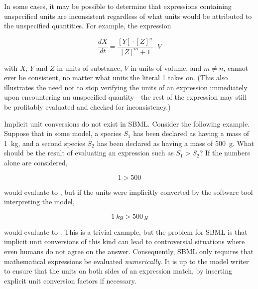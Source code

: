 In some cases, it may be possible to determine that expressions
containing unspecified units are inconsistent regardless of what
units would be attributed to the unspecified quantities.  For
example, the expression
\begin{linenomath}
  \begin{equation*}
    \frac{dX}{dt} = \frac{[Y] \cdot [Z]^n}{[Z]^m + 1} \cdot V
  \end{equation*}
\end{linenomath}
with $X$, $Y$ and $Z$ in units of substance, $V$ in
units of volume, and $m \neq n$, cannot ever be consistent, no
matter what units the literal 1 takes on.  (This also illustrates
the need not to stop verifying the units of an expression
immediately upon encountering an unspecified quantity---the rest
of the expression may still be profitably evaluated and checked
for inconsistency.)


\label{sec:no-implicit-conversions}

Implicit unit conversions do not exist in SBML.  Consider the
following example.  Suppose that in some model, a species $S_1$
has been declared as having a mass of 1~kg, and a second species
$S_2$ has been declared as having a mass of 500~g.  What should be
the result of evaluating an expression such as $S_1 > S_2$?  If
the numbers alone are considered,
\begin{linenomath}
  \begin{equation*}
    1 > 500
  \end{equation*}
\end{linenomath}
would evaluate to , but if the units were implicitly
converted by the software tool interpreting the model,
\begin{linenomath}
  \begin{equation*}
    1~kg > 500~g
  \end{equation*}
\end{linenomath}
would evaluate to .  This is a trivial example, but the
problem for SBML is that implicit unit conversions of this kind
can lead to controversial situations where even humans do not
agree on the answer.  Consequently, SBML only requires that
mathematical expressions be evaluated \emph{numerically}.  It is
up to the model writer to ensure that the units on both sides of
an expression match, by inserting explicit unit conversion factors
if necessary.

